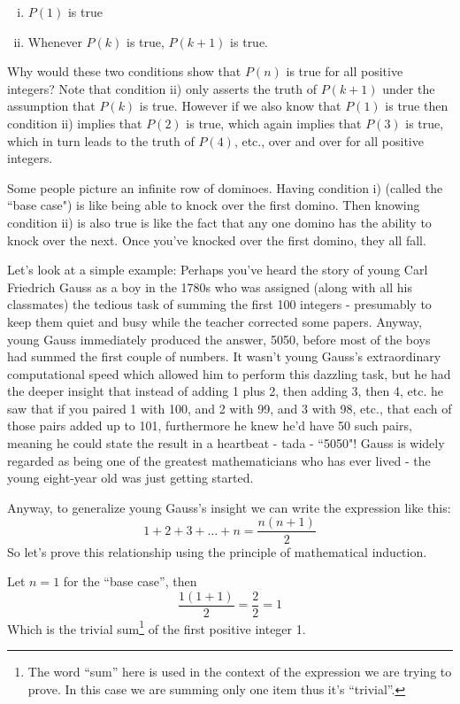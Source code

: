 \documentclass{article}
\begin{document}
\begin{enumerate}[i)]
\item $P(1)$ is true
\item Whenever $P(k)$ is true, $P(k+1)$ is true.
\end{enumerate}

Why would these two conditions show that $P(n)$ is true for all
positive integers? Note that condition ii) only asserts the truth
of $P(k+1)$ under the assumption that $P(k)$ is true.
However if we also know that $P(1)$ is true then condition ii) implies that $P(2)$ is true,
which again implies that $P(3)$ is true,
which in turn leads to the truth of $P(4)$,
etc., over and over for all positive integers.

Some people picture an infinite row of dominoes.
Having condition i) (called the ``base case") is like being
able to knock over the first domino.
Then knowing condition ii) is also true is like the
fact that any one domino has the ability to knock over the next.
Once you've knocked over the first domino,
they all fall.

Let's look at a simple example:
Perhaps you've heard the story of young Carl Friedrich Gauss
as a boy in
the 1780s who was assigned (along with all his classmates)
the tedious task of summing the first 100 integers -
presumably to keep them quiet and busy while the
teacher corrected some papers. Anyway,
young Gauss immediately produced the answer,
5050, before most of the boys had summed the first couple of numbers.
It wasn't young Gauss's extraordinary computational speed which allowed
him to perform this dazzling task,
but he had the deeper insight that instead of adding 1 plus 2,
then adding 3, then 4, etc.
he saw that if you paired 1 with 100,
and 2 with 99,
and 3 with 98,
etc.,
that each of those pairs added up to 101,
furthermore he knew he'd have 50 such pairs,
meaning he could state the result in a heartbeat - tada - ``5050"!
Gauss is widely regarded as being one of the greatest
mathematicians who has ever lived - the young eight-year old was just getting started.

\break
Anyway,
to generalize young Gauss's insight we can write the expression like this:
\[1+2+3+\ldots+n=\frac{n(n+1)}{2}\]
So let's prove this relationship using the principle of mathematical induction.
\bigskip

Let $n=1$ for the ``base case'',
then
\[\frac{1(1+1)}{2}=\frac{2}{2}=1\]
Which is the trivial sum\footnote{The word ``sum'' here is used in the context of the expression we are trying to prove. In this case we are summing only one item thus it's ``trivial''.} of the first positive integer 1.
\bigskip
\end{document}
